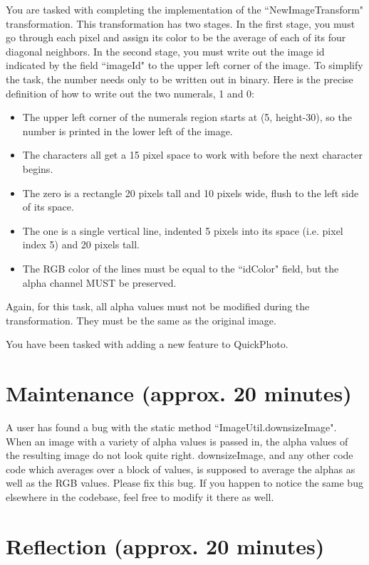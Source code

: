 \documentclass[12pt]{article}
\begin{document}
You are tasked with completing the implementation of the ``NewImageTransform" transformation.  This transformation has two stages.
In the first stage, you must go through each pixel and assign its color to be the average of each of its four diagonal neighbors.
In the second stage, you must write out the image id indicated by the field ``imageId" to the upper left corner of the image.
To simplify the task, the number needs only to be written out in binary.  Here is the precise definition of how to write out the two numerals, 1 and 0:

\begin{itemize}
\item The upper left corner of the numerals region starts at (5, height-30), so the number is printed in the lower left of the image.
\item The characters all get a 15 pixel space to work with before the next character begins.
\item The zero is a rectangle 20 pixels tall and 10 pixels  wide, flush to the left side of its space.
\item The one is a single vertical line, indented 5 pixels into its space (i.e. pixel index 5) and 20 pixels tall.
\item The RGB color of the lines must be equal to the ``idColor" field, but the alpha channel MUST be preserved.
\end{itemize}

Again, for this task, all alpha values must not be modified during the transformation. 
They must be the same as the original image.


You have been tasked with adding a new feature to QuickPhoto.


\section{Maintenance (approx. 20 minutes)}

A user has found a bug with the static method ``ImageUtil.downsizeImage".  When an image with a variety of alpha values 
is passed in, the alpha values of the resulting image do not look quite right.  downsizeImage, and any other code code which averages over a block of values,  is supposed to average the alphas as well as the RGB values.  Please fix this bug.  If you 
happen to notice the same bug elsewhere in the codebase, feel free to modify it there as well.


\section{Reflection (approx. 20 minutes)}
\end{document}
